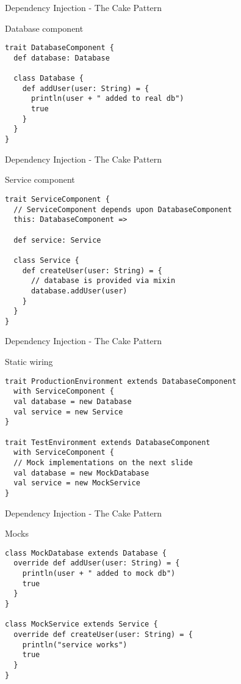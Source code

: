 \begin{frame}[fragile]{Dependency Injection - The Cake Pattern}
\begin{exampleblock}{Database component}
\begin{lstlisting}
trait DatabaseComponent {
  def database: Database

  class Database {
    def addUser(user: String) = {
      println(user + " added to real db")
      true
    }
  }
}
\end{lstlisting}
\end{exampleblock}
\end{frame}

\begin{frame}[fragile]{Dependency Injection - The Cake Pattern}
\begin{exampleblock}{Service component}
\begin{lstlisting}
trait ServiceComponent {
  // ServiceComponent depends upon DatabaseComponent
  this: DatabaseComponent =>
  
  def service: Service
  
  class Service {
    def createUser(user: String) = {
      // database is provided via mixin
      database.addUser(user)
    }
  }
}
\end{lstlisting}
\end{exampleblock}
\end{frame}

\begin{frame}[fragile]{Dependency Injection - The Cake Pattern}
\begin{exampleblock}{Static wiring}
\begin{lstlisting}
trait ProductionEnvironment extends DatabaseComponent
  with ServiceComponent {
  val database = new Database
  val service = new Service
}

trait TestEnvironment extends DatabaseComponent
  with ServiceComponent {
  // Mock implementations on the next slide
  val database = new MockDatabase
  val service = new MockService
}
\end{lstlisting}
\end{exampleblock}
\end{frame}

\begin{frame}[fragile]{Dependency Injection - The Cake Pattern}
\begin{exampleblock}{Mocks}
\begin{lstlisting}
class MockDatabase extends Database {
  override def addUser(user: String) = {
    println(user + " added to mock db")
    true
  }
}

class MockService extends Service {
  override def createUser(user: String) = {
    println("service works")
    true
  }
}
\end{lstlisting}
\end{exampleblock}
\end{frame}

